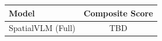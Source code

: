 \begin{tabular}{lc}
\toprule
Model & Composite Score \\
\midrule
SpatialVLM (Full) & TBD \\
\bottomrule
\end{tabular}
